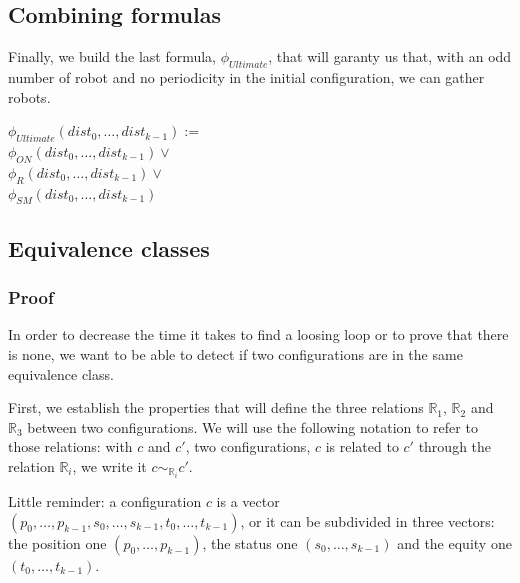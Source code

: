 \documentclass{article}
\begin{document}
\subsection{Combining formulas}

Finally, we build the last formula, $\phi_{Ultimate}$, that will garanty us that, with an odd number of robot and no periodicity in the initial configuration, we can gather robots.

\begin{center}
    
$\phi_{Ultimate} (dist_{0}, \ldots , dist_{k-1}):=$\\
$\phi_{ON} (dist_{0}, \ldots , dist_{k-1}) \lor$\\
$\phi_R (dist_{0}, \ldots , dist_{k-1}) \lor$\\
$\phi_{SM} (dist_{0}, \ldots , dist_{k-1})$
\end{center}

\subsection{Equivalence classes}
\subsubsection{Proof}

In order to decrease the time it takes to find a loosing loop or to prove that there is none, we want to be able to detect if two configurations are in the same equivalence class.

First, we establish the properties that will define the three relations $\mathbb{R}_{1}$, $\mathbb{R}_{2}$ and $\mathbb{R}_{3}$ between two configurations. We will use the following notation to refer to those relations: with $c$ and $c'$, two configurations, $c$ is related to $c'$ through the relation $\mathbb{R}_{i}$, we write it $c \sim_{\mathbb{R}_{i}} c'$.

Little reminder: a configuration $c$ is a vector $ (p_{0}, \dots, p_{k-1}, s_{0}, \dots, s_{k-1}, t_{0}, \dots, t_{k-1})$, or it can be subdivided in three vectors: the position one $ (p_{0}, \dots, p_{k-1})$, the status one $ (s_{0}, \dots, s_{k-1})$ and the equity one $ (t_{0}, \dots, t_{k-1})$.
\end{document}
